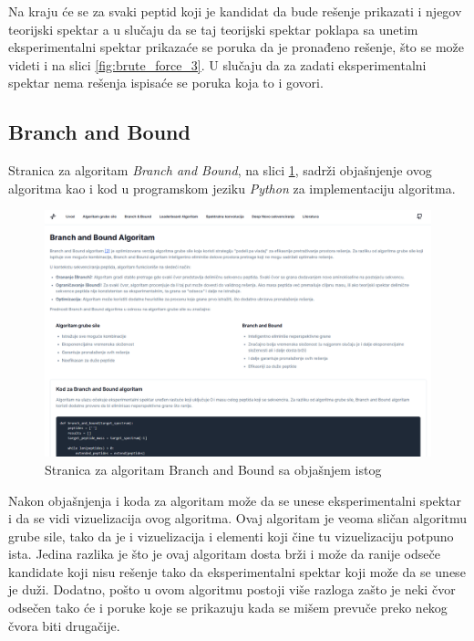\documentclass[12pt,oneside]{memoir}
\begin{document}
Na kraju će se za svaki peptid koji je kandidat da bude rešenje prikazati i njegov teorijski spektar a u slučaju da se taj teorijski spektar poklapa sa unetim eksperimentalni spektar prikazaće se poruka da je pronađeno rešenje, što se može videti i na slici \ref{fig:brute_force_3}. U slučaju da za zadati eksperimentalni spektar nema rešenja ispisaće se poruka koja to i govori.

\subsection{Branch and Bound}
Stranica za algoritam \emph{Branch and Bound}, na slici \ref{fig:branch_and_bound}, sadrži objašnjenje ovog algoritma kao i kod u programskom jeziku \emph{Python} za implementaciju algoritma.
\begin{figure}[h]
\centering
\includegraphics[width=1\textwidth]{images/branch_and_bound.png}
\caption{Stranica za algoritam Branch and Bound sa objašnjem istog}
\label{fig:branch_and_bound}
\end{figure}

Nakon objašnjenja i koda za algoritam može da se unese eksperimentalni spektar i da se vidi vizuelizacija ovog algoritma. Ovaj algoritam je veoma sličan algoritmu grube sile, tako da je i vizuelizacija i elementi koji čine tu vizuelizaciju potpuno ista. Jedina razlika je što je ovaj algoritam dosta brži i može da ranije odseče kandidate koji nisu rešenje tako da eksperimentalni spektar koji može da se unese je duži. Dodatno, pošto u ovom algoritmu postoji više razloga zašto je neki čvor odsečen tako će i poruke koje se prikazuju kada se mišem prevuče preko nekog čvora biti drugačije.
\end{document}
